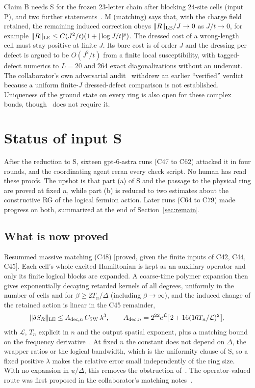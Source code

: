 \documentclass[11pt]{article}
\theoremstyle{definition}
\newcommand{\st}[1]{\textup{[\textsf{#1}]}}
\begin{document}
Claim B needs S for the frozen 23-letter chain after blocking 24-site cells (input P), and two further statements~\cite{refd24,C41,campaign}. M (matching) says that, with the charge field retained, the remaining induced correction obeys $\|R\|_{\rm LE}/J\to0$ as $J/t\to0$, for example $\|R\|_{\rm LE}\le C(J^2/t)(1+|\log J/t|^p)$. The dressed cost of a wrong-length cell must stay positive at finite $J$. Its bare cost is of order $J$ and the dressing per defect is argued to be $O(J^2/t)$ from a finite local susceptibility, with tagged-defect numerics to $L=20$ and 264 exact diagonalizations without an undercut. The collaborator's own adversarial audit~\cite{audit} withdrew an earlier ``verified'' verdict because a uniform finite-$J$ dressed-defect comparison is not established. Uniqueness of the ground state on every ring is also open for these complex bonds, though~\cite{LS} does not require it.

\section{Status of input S}
\label{sec:Sstatus}

After the reduction to S, sixteen gpt-6-astra runs (C47 to C62) attacked it in four rounds, and the coordinating agent reran every check script. No human has read these proofs. The upshot is that part (a) of S and the passage to the physical ring are proved at fixed $n$, while part (b) is reduced to two estimates about the constructive RG of the logical fermion action. Later runs (C64 to C79) made progress on both, summarized at the end of Section~\ref{sec:remain}.

\subsection{What is now proved}

Resummed massive matching (C48) \st{proved, given the finite inputs of C42, C44, C45}. Each cell's whole excited Hamiltonian is kept as an auxiliary operator and only its finite logical blocks are expanded. A coarse-time polymer expansion then gives exponentially decaying retarded kernels of all degrees, uniformly in the number of cells and for $\beta\ge 2T_n/\Delta$ (including $\beta\to\infty$), and the induced change of the retained action is linear in the C45 remainder,
\begin{align}
\|\delta S_R\|_{\rm LE}\le A_{{\rm dec},n}\,C_{\rm SW}\,\lambda^3,\qquad A_{{\rm dec},n}=2^{22}e^{\mathcal L}\big[2+16(16T_n/\mathcal L)^2\big],
\label{eq:C48}
\end{align}
with $\mathcal L$, $T_n$ explicit in $n$ and the output spatial exponent, plus a matching bound on the frequency derivative~\cite[PROOF Eqs.~20, 26, 29]{C48}. At fixed $n$ the constant does not depend on $\Delta$, the wrapper ratios or the logical bandwidth, which is the uniformity clause of S, so a fixed positive $\lambda$ makes the relative error small independently of the ring size. With no expansion in $u/\Delta$, this removes the obstruction of~\cite{C46}. The operator-valued route was first proposed in the collaborator's matching notes~\cite{direct}.
\end{document}
